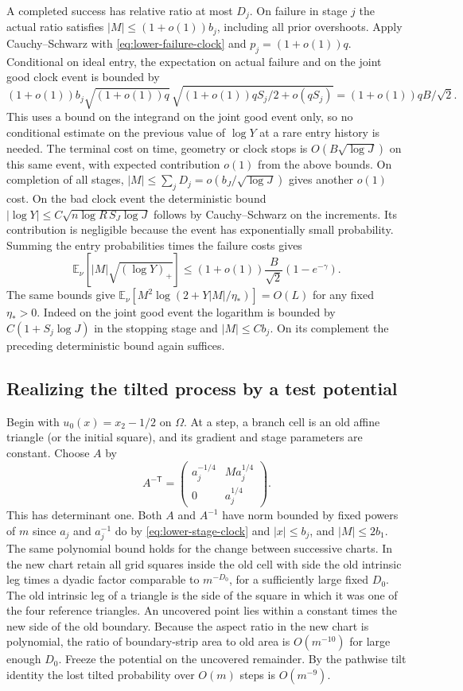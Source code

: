 \documentclass[11pt]{article}
\newcommand{\1}{\mathbf{1}}
\numberwithin{equation}{section}
\newcommand{\E}{\mathbb E}
\begin{document}
A completed success has relative ratio at most \(D_j\).
On failure in stage \(j\) the actual ratio satisfies
\(|M|\le (1+o(1))b_j\), including all prior overshoots.
Apply Cauchy--Schwarz with \eqref{eq:lower-failure-clock} and \(p_j=(1+o(1))q\).
Conditional on ideal entry, the expectation on actual
failure and on the joint good clock event is bounded by
\[
 (1+o(1))b_j\sqrt{(1+o(1))q}\,
       \sqrt{(1+o(1))q S_j/2+o(qS_j)}
 = (1+o(1))qB/\sqrt2.
\]
This uses a bound on the integrand on the joint good
event only, so no conditional estimate on the previous
value of \(\log Y\) at a rare entry history is needed.
The terminal cost on time, geometry or clock stops is
\(O(B\sqrt{\log J})\) on this same event, with expected
contribution \(o(1)\) from the above bounds. On completion
of all stages, \(|M|\le\sum_j D_j=o(b_J/\sqrt{\log J})\)
gives another \(o(1)\) cost. On the bad clock event the
deterministic bound
\(|\log Y|\le C\sqrt{n\log R\, S_J\log J}\)
follows by Cauchy--Schwarz on the increments. Its
contribution is negligible because the event has
exponentially small probability. Summing the entry
probabilities times the failure costs gives
\begin{equation}\label{eq:state-cost-sharp}
 \E_\nu[|M|\sqrt{(\log Y)_+}]
 \le (1+o(1))\frac B{\sqrt2}(1-e^{-\gamma}).
\end{equation}
The same bounds give
\(\E_\nu[M^2\log(2+Y|M|/\eta_*)]=O(L)\) for any fixed
\(\eta_*>0\). Indeed on the joint good event the
logarithm is bounded by \(C(1+S_j\log J)\) in the
stopping stage and \(|M|\le C b_j\). On its complement
the preceding deterministic bound again suffices.

\subsection{Realizing the tilted process by a test potential}

Begin with \(u_0(x)=x_2-1/2\) on \(\Omega\).
At a step, a branch cell is an old affine triangle (or the
initial square), and its gradient and stage parameters are
constant. Choose \(A\) by
\[
 A^{-\mathsf T}
   =\begin{pmatrix}a_j^{-1/4}&M a_j^{1/4}\\0&a_j^{1/4}\end{pmatrix}.
\]
This has determinant one. Both \(A\) and \(A^{-1}\) have
norm bounded by fixed powers of \(m\) since \(a_j\) and \(a_j^{-1}\)
do by \eqref{eq:lower-stage-clock} and \(|x|\le b_j\), and \(|M|\le 2b_1\).
The same polynomial bound holds for the change between
successive charts. In the new chart retain all grid squares
inside the old cell with side the old intrinsic leg times a
dyadic factor comparable to \(m^{-D_0}\), for a sufficiently
large fixed \(D_0\). The old intrinsic leg of a triangle is
the side of the square in which it was one of the four
reference triangles. An uncovered point lies within a
constant times the new side of the old boundary. Because
the aspect ratio in the new chart is polynomial, the ratio
of boundary-strip area to old area is \(O(m^{-10})\) for
large enough \(D_0\). Freeze the potential on the uncovered
remainder. By the pathwise tilt identity the lost tilted
probability over \(O(m)\) steps is \(O(m^{-9})\).
\end{document}
